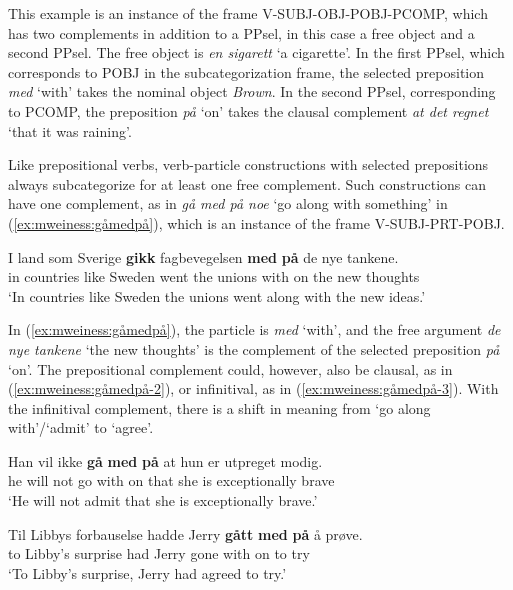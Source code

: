 \documentclass[output=paper]{langsci/langscibook}
\begin{document}
This example is an instance of the frame V-SUBJ-OBJ-POBJ-PCOMP, which has two complements in addition to a PPsel, in this case a free object and a second PPsel.
The free object is \emph{en sigarett} `a cigarette'. 
In the first PPsel, which corresponds to POBJ in the subcategorization frame, the selected preposition \emph{med} `with' takes the nominal object \emph{Brown}. 
In the second PPsel, corresponding to PCOMP,  the preposition \emph{på} `on' takes the clausal complement \emph{at det regnet} `that it was raining'.

Like prepositional verbs, verb-particle constructions with selected prepositions always subcategorize for at least one free complement. 
Such constructions can have one complement, as in \emph{gå med på noe} `go along with something' in (\ref{ex:mweiness:gåmedpå}), which is an instance of the frame V-SUBJ-PRT-POBJ.
 
\ea\label{ex:mweiness:gåmedpå}
\gll   I land som Sverige \textbf{gikk} fagbevegelsen \textbf{med} \textbf{på} de nye tankene. \\
        in countries like Sweden went {the unions} with on the new thoughts \\
\glt `In countries like Sweden the unions went along with the new ideas.' \\
\z

In (\ref{ex:mweiness:gåmedpå}), the particle is \emph{med} `with', and the free argument  \emph{de nye tankene} `the new thoughts' is the complement of the selected preposition \emph{på} `on'.  
The prepositional complement could, however, also be clausal, as in (\ref{ex:mweiness:gåmedpå-2}), or infinitival, as in (\ref{ex:mweiness:gåmedpå-3}).
With the infinitival complement, there is a shift in meaning from `go along with'/`admit' to `agree'. 

\ea\label{ex:mweiness:gåmedpå-2}
\gll   Han vil ikke \textbf{gå} \textbf{med} \textbf{på} at hun er utpreget modig. \\
        he will not go with on that she is exceptionally brave \\
\glt `He will not admit that she is exceptionally brave.' \\
\z

\ea\label{ex:mweiness:gåmedpå-3}
\gll   Til Libbys forbauselse hadde Jerry \textbf{gått} \textbf{med} \textbf{på} å prøve. \\
        to Libby's surprise had Jerry gone with on to try \\
\glt `To Libby's surprise, Jerry had agreed to try.' \\
\z
\end{document}

